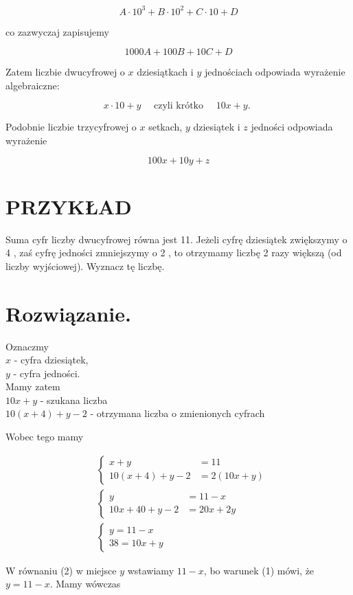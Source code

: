 \documentclass[10pt]{article}
\begin{document}
\[
A \cdot 10^{3}+B \cdot 10^{2}+C \cdot 10+D
\]

co zazwyczaj zapisujemy

\[
1000 A+100 B+10 C+D
\]

Zatem liczbie dwucyfrowej o \(x\) dziesiątkach i \(y\) jednościach odpowiada wyrażenie algebraiczne:

\[
x \cdot 10+y \quad \text { czyli krótko } \quad 10 x+y \text {. }
\]

Podobnie liczbie trzycyfrowej o \(x\) setkach, \(y\) dziesiątek i \(z\) jedności odpowiada wyrażenie

\[
100 x+10 y+z
\]

\section*{PRZYKŁAD}
Suma cyfr liczby dwucyfrowej równa jest 11. Jeżeli cyfrę dziesiątek zwiększymy o 4 , zaś cyfrę jedności zmniejszymy o 2 , to otrzymamy liczbę 2 razy większą (od liczby wyjściowej). Wyznacz tę liczbę.

\section*{Rozwiązanie.}
Oznaczmy\\
\(x\) - cyfra dziesiątek,\\
\(y\) - cyfra jedności.\\
Mamy zatem\\
\(10 x+y\) - szukana liczba\\
\(10(x+4)+y-2\) - otrzymana liczba o zmienionych cyfrach

Wobec tego mamy

\[
\begin{aligned}
& \begin{cases}x+y & =11 \\
10(x+4)+y-2 & =2(10 x+y)\end{cases} \\
& \begin{cases}y & =11-x \\
10 x+40+y-2 & =20 x+2 y\end{cases} \\
& \begin{cases}y=11-x \\
38=10 x+y\end{cases}
\end{aligned}
\]

W równaniu (2) w miejsce \(y\) wstawiamy \(11-x\), bo warunek (1) mówi, że \(y=11-x\). Mamy wówczas
\end{document}
